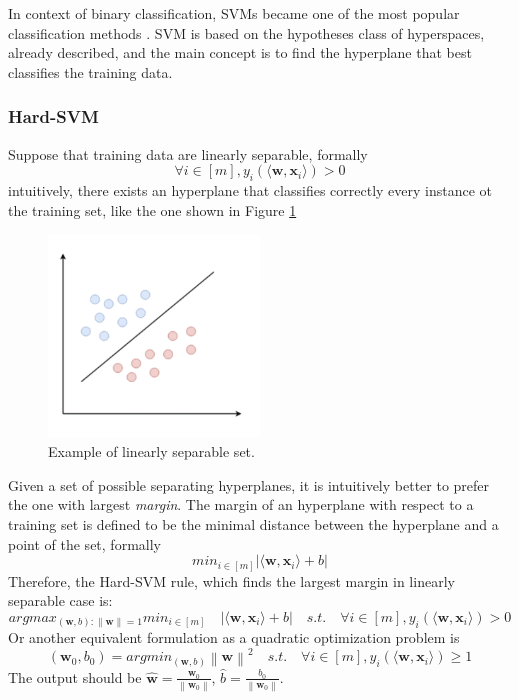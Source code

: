 In context of binary classification, \aclp{SVM} became one of the most popular classification methods \cite{article-svm}. \ac{SVM} is based on the hypotheses class of hyperspaces, already described, and the main concept is to find the hyperplane that best classifies the training data.

\subsubsection{Hard-SVM}

Suppose that training data are linearly separable, formally
\[ \forall i \in [m], y_i (\langle \mathbf{w}, \mathbf{x}_i \rangle) > 0 \]
intuitively, there exists an hyperplane that classifies correctly every instance ot the training set, like the one shown in Figure \ref{fig:linearly-separable}

\begin{figure}[ht]
	\centering
	\includegraphics[width=0.5\textwidth]{figures/linearly-separable.png}
	\caption{Example of linearly separable set.}
	\label{fig:linearly-separable}
\end{figure}

Given a set of possible separating hyperplanes, it is intuitively better to prefer the one with largest \textit{margin}. The margin of an hyperplane with respect to a training set is defined to be the minimal distance between the hyperplane and a point of the set, formally
\[ min_{i \in [m]} | \langle \mathbf{w}, \mathbf{x}_i \rangle + b | \]
Therefore, the Hard-\ac{SVM} rule, which finds the largest margin in linearly separable case is:
\[ argmax_{(\mathbf{w}, b) : \left\lVert \mathbf{w} \right\rVert = 1} min_{i \in [m]} \quad | \langle \mathbf{w}, \mathbf{x}_i \rangle + b | \quad s.t. \quad \forall i \in [m], y_i (\langle \mathbf{w}, \mathbf{x}_i \rangle) > 0 \]
Or another equivalent formulation as a quadratic optimization problem is
\[ (\mathbf{w}_0, b_0) = argmin_{(\mathbf{w}, b)} \left\lVert \mathbf{w} \right\rVert ^2 \quad s.t. \quad \forall i \in [m], y_i (\langle \mathbf{w}, \mathbf{x}_i \rangle) \ge 1 \]
The output should be $\hat{\mathbf{w}} = \frac{\mathbf{w}_0}{\left\lVert \mathbf{w}_0 \right\rVert}$, $\hat{b} = \frac{b_0}{\left\lVert \mathbf{w}_0 \right\rVert}$.

